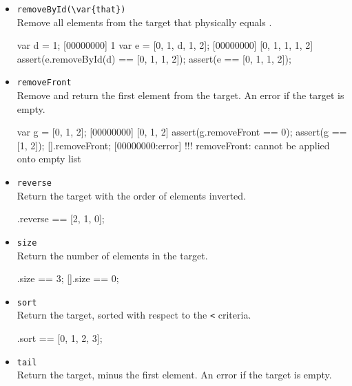 \begin{itemize}
\item \lstinline|removeById(\var{that})|\\
  Remove all elements from the target that physically equals
  .

\begin{urbiscript}[firstnumber=last]
var d = 1;
[00000000] 1
var e = [0, 1, d, 1, 2];
[00000000] [0, 1, 1, 1, 2]
assert(e.removeById(d) == [0, 1, 1, 2]);
assert(e == [0, 1, 1, 2]);
\end{urbiscript}

\item \lstinline|removeFront|\\
Remove and return the first element from the target. An error if the
target is empty.

\begin{urbiscript}[firstnumber=last]
var g = [0, 1, 2];
[00000000] [0, 1, 2]
assert(g.removeFront == 0);
assert(g == [1, 2]);
[].removeFront;
[00000000:error] !!! removeFront: cannot be applied onto empty list
\end{urbiscript}

\item \lstinline|reverse|\\
Return the target with the order of elements inverted.

\begin{urbiassert}[firstnumber=last]
[0, 1, 2].reverse == [2, 1, 0];
\end{urbiassert}

\item \lstinline|size|\\
Return the number of elements in the target.

\begin{urbiassert}[firstnumber=last]
[0, 1, 2].size == 3;
[].size == 0;
\end{urbiassert}

\item \lstinline|sort|\\
Return the target, sorted with respect to the \lstinline|<| criteria.

\begin{urbiassert}[firstnumber=last]
[1, 0, 3, 2].sort == [0, 1, 2, 3];
\end{urbiassert}

\item \lstinline|tail|\\
Return the target, minus the first element. An error if the target is
empty.


\end{itemize}
